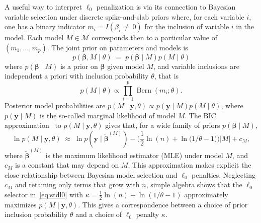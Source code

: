 \documentclass[
  12pt]{article}
\newcommand{\M}{\mathcal{M}}
\newcommand{\by}{\mathbf{y}}
\newcommand{\bbeta}{\boldsymbol{\beta}}
\begin{document}
A useful way to interpret $\ell_0$ penalization is via its connection to Bayesian variable selection under discrete spike-and-slab priors where, for each variable $i$, one has a binary indicator $m_i=I(\beta_i\,\neq\,0)$ for the inclusion of variable $i$ in the model. Each model $M \in \M$ corresponds then to a particular value of $(m_1,\ldots,m_p)$. The joint prior on parameters and models is 
\begin{equation}\label{eq:bayesianframework}
    p(\bbeta,M \mid \theta)\;=\;p( \bbeta \mid  M) p(M \mid \theta)
\end{equation}
where $p( \bbeta \mid  M)$ is a prior on $\bbeta$ given model $M$, and 
variable inclusions are independent a priori with inclusion probability $\theta$, that is
\begin{equation} \label{eq:modelprior}
p( M \mid \theta) \propto
        \prod_{i=1}^p \operatorname{Bern}\left(m_i ; \theta\right).
\end{equation}
Posterior model probabilities are $p(M \mid \by, \theta) \propto p(\by \mid M) p(M \mid \theta)$, where $p(\by \mid M)$ is the so-called marginal likelihood of model $M$. The BIC approximation~\citep{BIC} to $p(M\mid \by, \theta)$ gives that, for a wide family of priors $p(\bbeta \mid M)$, 
\begin{equation}\label{eq:dfbapon}
\ln p(M \mid\by, \theta) \;\approx\; \ln p(\by \mid \tilde{\bbeta}^{(M)}) - \Big(\frac{1}{2}\ln(n) + \ln \big(1/\theta-1\big)\Big)|M| + c_M,
\end{equation}
where $\tilde{\bbeta}^{(M)}$ is the maximum likelihood estimator (MLE) under model $M$, and $c_M$ is a constant that may depend on $M$.
This approximation makes explicit the close relationship between Bayesian model selection and $\ell_0$ penalties. Neglecting $c_M$ and retaining only terms that grow with $n$, simple algebra shows that the $\ell_0$ selector in~\eqref{eq:stdl0} with $\kappa = \frac12 \ln(n) + \ln(1/\theta - 1)$ approximately maximizes $p(M \mid \by, \theta)$. This gives a correspondence between a choice of prior inclusion probability $\theta$ and a choice of $\ell_0$ penalty $\kappa$. 
\end{document}
